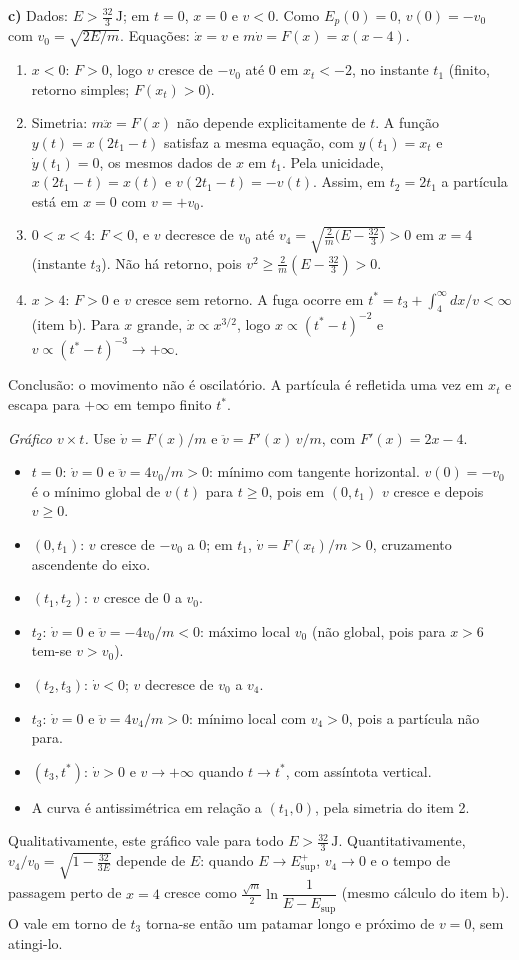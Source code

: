 \documentclass{article}%
\begin{document}
\textbf{c)} Dados: $E>\tfrac{32}{3}\,\mathrm{J}$; em $t=0$, $x=0$ e $v<0$. Como $E_p(0)=0$, $v(0)=-v_0$ com $v_0=\sqrt{2E/m}$. Equações: $\dot x=v$ e $m\dot v=F(x)=x(x-4)$.
\begin{enumerate}
\item $x<0$: $F>0$, logo $v$ cresce de $-v_0$ até $0$ em $x_t<-2$, no instante $t_1$ (finito, retorno simples; $F(x_t)>0$).
\item Simetria: $m\ddot x=F(x)$ não depende explicitamente de $t$. A função $y(t)=x(2t_1-t)$ satisfaz a mesma equação, com $y(t_1)=x_t$ e $\dot y(t_1)=0$, os mesmos dados de $x$ em $t_1$. Pela unicidade, $x(2t_1-t)=x(t)$ e $v(2t_1-t)=-v(t)$. Assim, em $t_2=2t_1$ a partícula está em $x=0$ com $v=+v_0$.
\item $0<x<4$: $F<0$, e $v$ decresce de $v_0$ até $v_4=\sqrt{\tfrac{2}{m}\bigl(E-\tfrac{32}{3}\bigr)}>0$ em $x=4$ (instante $t_3$). Não há retorno, pois $v^{2}\ge\tfrac{2}{m}(E-\tfrac{32}{3})>0$.
\item $x>4$: $F>0$ e $v$ cresce sem retorno. A fuga ocorre em $t^{*}=t_3+\int_4^\infty dx/v<\infty$ (item b). Para $x$ grande, $\dot x\propto x^{3/2}$, logo $x\propto(t^{*}-t)^{-2}$ e $v\propto(t^{*}-t)^{-3}\to+\infty$.
\end{enumerate}
Conclusão: o movimento não é oscilatório. A partícula é refletida uma vez em $x_t$ e escapa para $+\infty$ em tempo finito $t^{*}$.

\textit{Gráfico $v\times t$.} Use $\dot v=F(x)/m$ e $\ddot v=F'(x)\,v/m$, com $F'(x)=2x-4$.
\begin{itemize}
\item $t=0$: $\dot v=0$ e $\ddot v=4v_0/m>0$: mínimo com tangente horizontal. $v(0)=-v_0$ é o mínimo global de $v(t)$ para $t\ge 0$, pois em $(0,t_1)$ $v$ cresce e depois $v\ge 0$.
\item $(0,t_1)$: $v$ cresce de $-v_0$ a $0$; em $t_1$, $\dot v=F(x_t)/m>0$, cruzamento ascendente do eixo.
\item $(t_1,t_2)$: $v$ cresce de $0$ a $v_0$.
\item $t_2$: $\dot v=0$ e $\ddot v=-4v_0/m<0$: máximo local $v_0$ (não global, pois para $x>6$ tem-se $v>v_0$).
\item $(t_2,t_3)$: $\dot v<0$; $v$ decresce de $v_0$ a $v_4$.
\item $t_3$: $\dot v=0$ e $\ddot v=4v_4/m>0$: mínimo local com $v_4>0$, pois a partícula não para.
\item $(t_3,t^{*})$: $\dot v>0$ e $v\to+\infty$ quando $t\to t^{*}$, com assíntota vertical.
\item A curva é antissimétrica em relação a $(t_1,0)$, pela simetria do item 2.
\end{itemize}
Qualitativamente, este gráfico vale para todo $E>\tfrac{32}{3}\,\mathrm{J}$. Quantitativamente, $v_4/v_0=\sqrt{1-\tfrac{32}{3E}}$ depende de $E$: quando $E\to E_{\text{sup}}^{+}$, $v_4\to 0$ e o tempo de passagem perto de $x=4$ cresce como $\tfrac{\sqrt{m}}{2}\ln\dfrac{1}{E-E_{\text{sup}}}$ (mesmo cálculo do item b). O vale em torno de $t_3$ torna-se então um patamar longo e próximo de $v=0$, sem atingi-lo.
\end{document}
